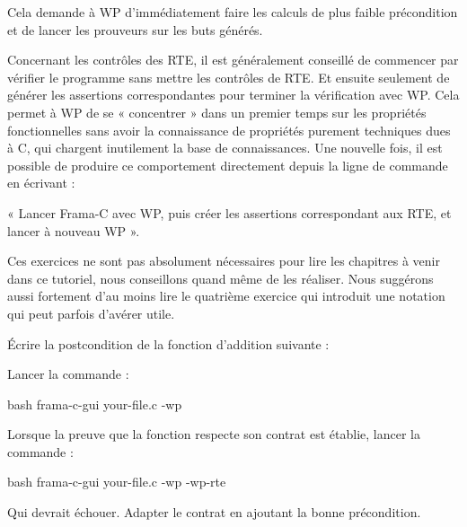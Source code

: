 Cela demande à WP d'immédiatement faire les calculs de plus faible précondition
et de lancer les prouveurs sur les buts générés.



Concernant les contrôles des RTE, il est généralement conseillé de commencer par
vérifier le programme sans mettre les contrôles de RTE. Et ensuite seulement de
générer les assertions correspondantes pour terminer la vérification avec WP. 
Cela permet à WP de se « concentrer » dans un premier temps sur les propriétés 
fonctionnelles sans avoir la connaissance de propriétés purement techniques dues
à C, qui chargent inutilement la base de connaissances. Une nouvelle fois, il est
possible de produire ce comportement directement depuis la ligne de commande en
écrivant :






« Lancer Frama-C avec WP, puis créer les assertions correspondant aux RTE, et 
lancer à nouveau WP ».




Ces exercices ne sont pas absolument nécessaires pour lire les chapitres à
venir dans ce tutoriel, nous conseillons quand même de les réaliser. Nous
suggérons aussi fortement d'au moins lire le quatrième exercice qui introduit
une notation qui peut parfois d'avérer utile.




Écrire la postcondition de la fonction d'addition suivante :




Lancer la commande :

\begin{CodeBlock}{bash}
frama-c-gui your-file.c -wp
\end{CodeBlock}


Lorsque la preuve que la fonction respecte son contrat est établie, lancer
la commande :

\begin{CodeBlock}{bash}
frama-c-gui your-file.c -wp -wp-rte
\end{CodeBlock}


Qui devrait échouer. Adapter le contrat en ajoutant la bonne précondition.




